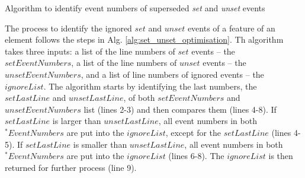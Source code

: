 \documentclass{llncs}
\begin{document}
\IncMargin{1.4em}
\begin{algorithm}[H]
    \begin{small}
    \end{small}
    \caption{Algorithm to identify event numbers of superseded \emph{set} and \emph{unset} events}
    \label{alg:set_unset_optimisation}
\end{algorithm}
\DecMargin{1.4em}

The process to identify the ignored $set$ and $unset$ events of a feature of an element follows the steps in Alg. \ref{alg:set_unset_optimisation}. Th algorithm takes three inputs: a list of the line numbers of $set$ events -- the $setEventNumbers$, a list of the line numbers of $unset$ events -- the $unsetEventNumbers$, and a list of line numbers of ignored events -- the $ignoreList$. The algorithm starts by identifying the last numbers, the $setLastLine$ and $unsetLastLine$, of both $setEventNumbers$ and $unsetEventNumbers$ list (lines 2-3) and then compares them (lines 4-8). If $setLastLine$ is larger than $unsetLastLine$, all event numbers in both $^*EventNumbers$ are put into the $ignoreList$, except for the $setLastLine$ (lines 4-5). If $setLastLine$ is smaller than $unsetLastLine$, all event numbers in both $^*EventNumbers$ are put into the $ignoreList$ (lines 6-8). The $ignoreList$ is then returned for further process (line 9).
\end{document}
